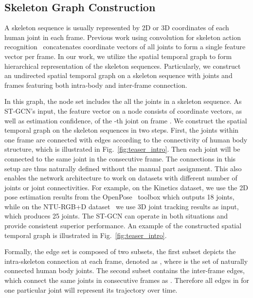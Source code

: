 \documentclass[letterpaper]{article} \usepackage{aaai18}  \usepackage{times}  \usepackage{helvet}  \usepackage{courier}  \usepackage{url}  \usepackage{graphicx}
\begin{document}
\subsection{Skeleton Graph Construction}
\label{sec:graph_construction}
A skeleton sequence is usually represented by 2D or 3D coordinates of each human joint in each frame. Previous work using convolution for skeleton action recognition~\cite{Kim2017CVPRW} concatenates coordinate vectors of all joints to form a single feature vector per frame.
In our work, we utilize the spatial temporal graph to form hierarchical representation of the skeleton sequences. 
Particularly, we construct an undirected spatial temporal graph  on a skeleton sequence with  joints and  frames featuring both intra-body and inter-frame connection.

In this graph, the node set  includes the all the joints in a skeleton sequence. 
As ST-GCN's input, the feature vector on a node  consists of coordinate vectors, as well as estimation confidence, of the -th joint on frame .
We construct the spatial temporal graph on the skeleton sequences in two steps. 
First, the joints within one frame are connected with edges according to the connectivity of human body structure, which is illustrated in Fig.~\ref{fig:teaser_intro}. 
Then each joint will be connected to the same joint in the consecutive frame.
The connections in this setup are thus naturally defined without the manual part assignment. 
This also enables the network architecture to work on datasets with different number of joints or joint connectivities.
For example, on the Kinetics dataset, we use the 2D pose estimation results from the OpenPose~\cite{Cao2017Openpose} toolbox which outputs 18 joints, while on the NTU-RGB+D dataset~\cite{Shahroudy2016CVPR} we use 3D joint tracking results as input, which produces 25 joints.
The ST-GCN can operate in both situations and provide consistent superior performance.
An example of the constructed spatial temporal graph is illustrated in Fig.~\ref{fig:teaser_intro}.

Formally,
the edge set  is composed of two subsets, the first subset depicts the intra-skeleton connection at each frame, denoted as
,
where  is the set of naturally connected human body joints.
The second subset contains the inter-frame edges, which connect the same joints in consecutive frames as
. 
Therefore all edges in  for one particular joint  will represent its trajectory over time.
\end{document}
